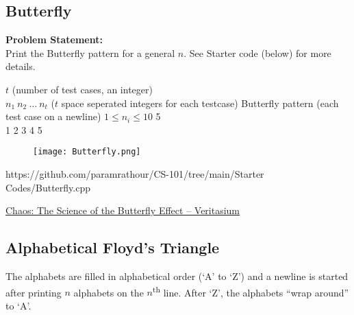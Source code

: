 \subsection{Butterfly}{\label{pp:butterfly}}
\textbf{Problem Statement:}\\
Print the Butterfly pattern for a general $n$. See Starter code (below) for more details.
\begin{testcases}
	{$t$ \hfill(number of test cases, an integer)\\
	$n_1\ n_2\ \ldots\ n_t$ \hfill($t$ space seperated integers for each testcase)}
	{Butterfly pattern \hfill(each test case on a newline)}
	{$1 \leq n_i \leq 10$}
	{5\\1 2 3 4 5}
	{\vspace{-2em}
	\begin{figure}[H]
	\texttt{[image: Butterfly.png]}
	\end{figure}
	}
	{https://github.com/paramrathour/CS-101/tree/main/Starter Codes/Butterfly.cpp}
\end{testcases}
\begin{funvideo}
\href{https://youtu.be/fDek6cYijxI}{Chaos: The Science of the Butterfly Effect -- Veritasium}
\end{funvideo}
\subsection{Alphabetical Floyd's Triangle}{\label{pp:alphabeticalfloydstriangle}}
The alphabets are filled in alphabetical order (`A' to `Z') and a newline is started after printing $n$ alphabets on the $n$\textsuperscript{th} line. After `Z', the alphabets ``wrap around'' to `A'.

